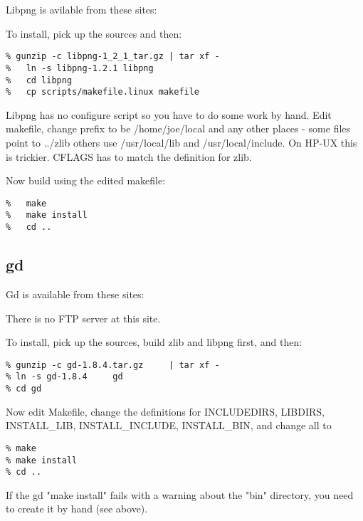 \documentclass{report}
\begin{document}
Libpng is avilable from these sites:


To install, pick up the sources and then:

\begin{verbatim}
% gunzip -c libpng-1_2_1_tar.gz | tar xf -
%   ln -s libpng-1.2.1 libpng
%   cd libpng
%   cp scripts/makefile.linux makefile
\end{verbatim}

Libpng has no configure script so you have to do some work by
hand. Edit makefile, change prefix to be /home/joe/local and any
other places - some files point to ../zlib  others use
/usr/local/lib and /usr/local/include. On HP-UX this is
trickier. CFLAGS has to match the definition for zlib.

Now build using the edited makefile:

\begin{verbatim}
%   make
%   make install
%   cd ..
\end{verbatim}


\subsection{gd}

Gd is available from these sites:


There is no FTP server at this site.

To install, pick up the sources, build zlib and libpng first, and then:

\begin{verbatim}
% gunzip -c gd-1.8.4.tar.gz     | tar xf -
% ln -s gd-1.8.4     gd
% cd gd
\end{verbatim}

Now edit Makefile, change the definitions for INCLUDEDIRS, LIBDIRS,
INSTALL\_LIB, INSTALL\_INCLUDE, INSTALL\_BIN, and change all
 to 

\begin{verbatim}
% make
% make install
% cd ..
\end{verbatim}

If the gd "make install" fails with a warning about the "bin"
directory, you need to create it by hand (see above).
\end{document}
